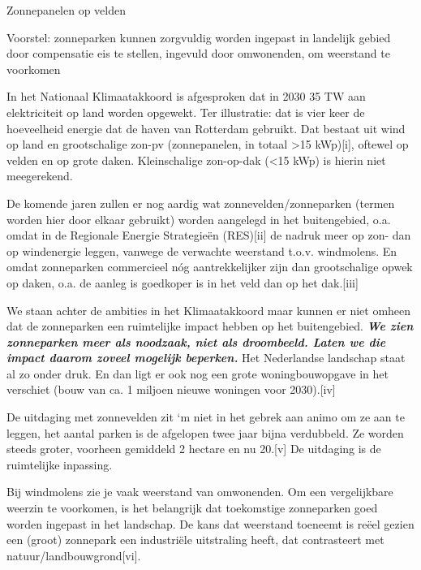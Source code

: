 \begin{voorstel}{Zonnepanelen op velden}

\begin{samenvatting}
Voorstel: zonneparken kunnen zorgvuldig worden ingepast in landelijk gebied door compensatie eis te stellen, ingevuld door omwonenden, om weerstand te voorkomen
\end{samenvatting}

\begin{uitdaging}
In het Nationaal Klimaatakkoord is afgesproken dat in 2030 35 TW aan elektriciteit op land worden opgewekt. Ter illustratie: dat is vier keer de hoeveelheid energie dat de haven van Rotterdam gebruikt. Dat bestaat uit wind op land en grootschalige zon-pv  (zonnepanelen, in totaal >15 kWp)[i], oftewel op velden en op grote daken. Kleinschalige zon-op-dak (<15 kWp) is hierin niet meegerekend.

De komende jaren zullen er nog aardig wat zonnevelden/zonneparken (termen worden hier door elkaar gebruikt) worden aangelegd in het buitengebied, o.a. omdat in de Regionale Energie Strategieën (RES)[ii] de nadruk meer op zon- dan op windenergie leggen, vanwege de verwachte weerstand t.o.v. windmolens. En omdat zonneparken commercieel nóg aantrekkelijker zijn dan grootschalige opwek op daken, o.a. de aanleg is goedkoper is in het veld dan op het dak.[iii]

We staan achter de ambities in het Klimaatakkoord maar kunnen er niet omheen dat de zonneparken een ruimtelijke impact hebben op het buitengebied. \textbf{\em{We zien zonneparken meer als noodzaak, niet als droombeeld. Laten we die impact daarom zoveel mogelijk beperken.}} Het Nederlandse landschap staat al zo onder druk. En dan ligt er ook nog een grote woningbouwopgave in het verschiet (bouw van ca. 1 miljoen nieuwe woningen voor 2030).[iv]

De uitdaging met zonnevelden zit ‘m niet in het gebrek aan animo om ze aan te leggen, het aantal parken is de afgelopen twee jaar bijna verdubbeld. Ze worden steeds groter, voorheen gemiddeld 2 hectare en nu 20.[v] De uitdaging is de ruimtelijke inpassing.

Bij windmolens zie je vaak weerstand van omwonenden. Om een vergelijkbare weerzin te voorkomen, is het belangrijk dat toekomstige zonneparken goed worden ingepast in het landschap. De kans dat weerstand toeneemt is reëel gezien een (groot) zonnepark een industriële uitstraling heeft, dat contrasteert met natuur/landbouwgrond[vi].


\end{uitdaging}
\end{voorstel}
